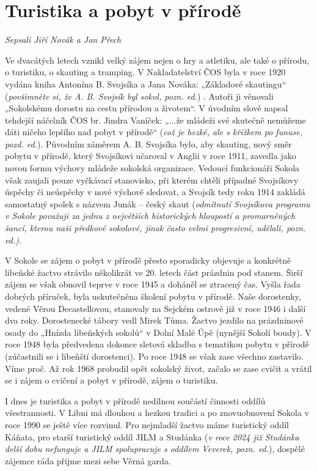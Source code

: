 \section{Turistika a pobyt v
přírodě}\label{turistika-a-pobyt-v-pux159uxedrodux11b}

\emph{Sepsali Jiří Novák a Jan Přech}

Ve dvacátých letech vznikl velký zájem nejen o hry a atletiku, ale také
o přírodu, o turistiku, o skauting a tramping. V Nakladatelství ČOS byla
v roce 1920 vydána kniha Antonína B. Svojsíka a Jana Nováka: „Základové
skautingu`` (\emph{povšimněte si, že A. B. Svojsík byl sokol, pozn.
ed.}) . Autoři ji věnovali „Sokolskému dorostu na cestu přírodou a
životem``. V úvodním slově napsal tehdejší náčelník ČOS br. Jindra
Vaníček: „...že mládeži své skutečně nemůžeme dáti ničeho lepšího nad
pobyt v přírodě`` (\emph{což je hezké, ale s křížkem po funuse, pozd.
ed.}). Původním záměrem A. B. Svojsíka bylo, aby skauting, nový směr
pobytu v přírodě, který Svojsíkovi učaroval v Anglii v roce 1911,
zavedla jako novou formu výchovy mládeže sokolská organizace. Vedoucí
funkcionáři Sokola však zaujali pouze vyčkávací stanovisko, při kterém
chtěli případné Svojsíkovy úspěchy či neúspěchy v nové výchově sledovat,
a Svojsík tedy roku 1914 zakládá samostatný spolek s názvem Junák --
český skaut (\emph{odmítnutí Svojsíkova programu v Sokole považuji za
jednu z největších historických hloupostí a promarněných šancí, kterou
naši předkové sokolové, jinak často velmi progresivní, udělali, pozn.
ed.).}

V Sokole se zájem o pobyt v přírodě přesto sporadicky objevuje a
konkrétně libeňské žactvo strávilo několikrát ve 20. letech část
prázdnin pod stanem. Širší zájem se však obnovil teprve v roce 1945 a
doháněl se ztracený čas. Vyšla řada dobrých příruček, byla uskutečněna
školení pobytu v přírodě. Naše dorostenky, vedené Věrou Decastellovou,
stanovaly na Sejckém ostrově již v roce 1946 i další dva roky.
Dorostenecké tábory vedl Mirek Tůma. Žactvo jezdilo na prázdninové osady
do „Hnízda libeňských sokolů`` v Dolní Malé Úpě (nynější Sokolí boudy).
V roce 1948 byla předvedena dokonce sletová skladba s tematikou pobytu v
přírodě (zúčastnili se i libeňští dorostenci). Po roce 1948 se však zase
všechno zastavilo. Víme proč. Až rok 1968 probudil opět sokolský život,
začalo se zase cvičit a vrátil se i zájem o cvičení a pobyt v přírodě,
zájem o turistiku.

I dnes je turistika a pobyt v přírodě nedílnou součástí činnosti oddílů
všestrannosti. V Libni má dlouhou a hezkou tradici a po znovuobnovení
Sokola v roce 1990 se ještě více rozvinul. Pro nejmladší žactvo máme
turistický oddíl Káňata, pro starší turistický oddíl JILM a Studánka
(\emph{v roce 2024 již Studánka delší dobu nefunguje a JILM spolupracuje
s oddílem Veverek, pozn. ed.}), dospělé zájemce ráda přijme mezi sebe
Věrná garda.

